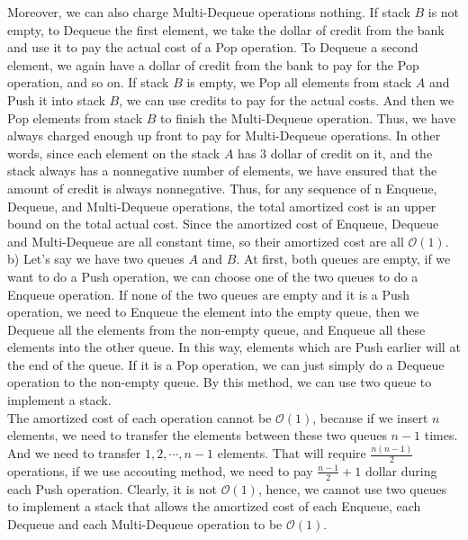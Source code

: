 \documentclass[12pt,letterpaper]{article}
\begin{document}
Moreover, we can also charge Multi-Dequeue operations nothing. If stack $B$ is not empty, to Dequeue the first element, we take the dollar of credit from the bank and use it to pay the actual cost of a Pop operation. To Dequeue a second element, we again have a dollar of credit from the bank to pay for the Pop operation, and so on. If stack $B$ is empty, we Pop all elements from stack $A$ and Push it into stack $B$, we can use credits to pay for the actual costs. And then we Pop elements from stack $B$ to finish the Multi-Dequeue operation. Thus, we have always charged enough up front to pay for Multi-Dequeue operations. In other words, since each element on the stack $A$ has 3 dollar of credit on it, and the stack always has a nonnegative number of elements, we have ensured that the amount of credit is always nonnegative. Thus, for any sequence of n Enqueue, Dequeue, and Multi-Dequeue operations, the total amortized cost is an upper bound on the total actual cost. Since the amortized cost of Enqueue, Dequeue and Multi-Dequeue are all constant time, so their amortized cost are all $\mathcal{O}(1)$. \\
b) Let's say we have two queues $A$ and $B$. At first, both queues are empty, if we want to do a Push operation, we can choose one of the two queues to do a Enqueue operation. If none of the two queues are empty and it is a Push operation, we need to Enqueue the element into the empty queue, then we Dequeue all the elements from the non-empty queue, and Enqueue all these elements into the other queue. In this way, elements which are Push earlier will at the end of the queue. If it is a Pop operation, we can just simply do a Dequeue operation to the non-empty queue. By this method, we can use two queue to implement a stack. \\
The amortized cost of each operation cannot be $\mathcal{O}(1)$, because if we insert $n$ elements, we need to transfer the elements between these two queues $n-1$ times. And we need to transfer $1,2,\cdots,n-1$ elements. That will require $\frac{n(n-1)}{2}$ operations, if we use accouting method, we need to pay $\frac{n-1}{2} + 1$ dollar during each Push operation. Clearly, it is not $\mathcal{O}(1)$, hence, we cannot use two queues to implement a stack that allows the amortized cost of each Enqueue, each Dequeue and each Multi-Dequeue operation to be $\mathcal{O}(1)$. 
\end{document}
